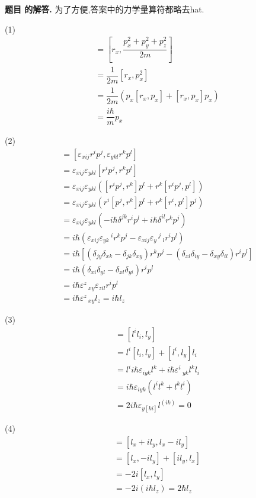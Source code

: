 \documentclass[12pt, a4paper, oneside]{ctexart}
\newcounter{problemname}
\newenvironment{solution}
  {\par\noindent\textbf{题目 \theproblemname 的解答. }}
  {\par}
\begin{document}
\begin{solution}
    为了方便,答案中的力学量算符都略去hat.

  (1)
  \begin{align*}
    [r_x,T] &= \left[r_x,\dfrac{p_x^2+p_y^2+p_z^2}{2m}\right] \\
    &= \dfrac{1}{2m} [r_x,p_x^2] \\
    &=\dfrac{1}{2m}(p_x[r_x,p_x]+[r_x,p_x]p_x)\\
    &=\dfrac{i\hbar}{m}p_x
  \end{align*}

  (2)
  \begin{align*}
    [l_x,l_y] &= [\varepsilon_{xij}r^ip^j,\varepsilon_{ykl}r^kp^l]\\
    &=\varepsilon_{xij}\varepsilon_{ykl}[r^ip^j,r^kp^l]\\
    &=\varepsilon_{xij}\varepsilon_{ykl}([r^ip^j,r^k]p^l+r^k[r^ip^j,p^l])\\
    &=\varepsilon_{xij}\varepsilon_{ykl}(r^i[p^j,r^k]p^l+r^k[r^i,p^l]p^j)\\
    &=\varepsilon_{xij}\varepsilon_{ykl}(-i\hbar\delta^{jk}r^ip^l+i\hbar\delta^{il}r^kp^j)\\
    &=i\hbar(\varepsilon_{xij}\varepsilon_{yk}\,^{i}r^kp^j - \varepsilon_{xij}\varepsilon_{y}\,^j \,_{l}r^ip^l)\\
    &=i\hbar[(\delta_{jy}\delta_{xk}-\delta_{jk}\delta_{xy})r^kp^j-(\delta_{xl}\delta_{iy}-\delta_{xy}\delta_{il})r^ip^l]\\
    &=i\hbar(\delta_{xi}\delta_{yl} - \delta_{xl}\delta_{yi})r^ip^l\\
    &=i\hbar \varepsilon^z\,_{xy} \varepsilon_{zil}r^ip^l\\
    &=i\hbar \varepsilon^z\,_{xy}l_z = i\hbar l_z
  \end{align*}

  (3)
  \begin{align*}
    [l^2,l_y] &= [l^il_i,l_y]\\
    &=l^i[l_i,l_y]+[l^i,l_y]l_i\\
    &=l^i i\hbar \varepsilon_{iyk} l^k + i\hbar \varepsilon^i\,_{yk} l^k l_i \\
    &=i\hbar \varepsilon_{iyk}(l^il^k + l^kl^i)\\
    &=2i\hbar \varepsilon_{y[ki]}l^{(ik)} = 0
  \end{align*}

  (4)
  \begin{align*}
    [l_+,l_-] &= [l_x + il_y,l_x - il_y] \\
    &=[l_x,-il_y]+[il_y,l_x]\\
    &=-2i [l_x,l_y]\\
    &=-2i (i\hbar l_z) = 2\hbar l_z
  \end{align*}
\end{solution}
\end{document}
